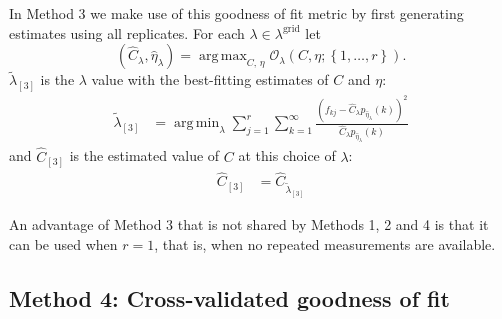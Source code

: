 \documentclass[12pt]{article}
\DeclareMathOperator*{\argmin}{arg\,min}
\DeclareMathOperator*{\argmax}{arg\,max}
\newcommand{\lambdagrid}{\lambda^{\text{grid}}}
\theoremstyle{break}
\theoremstyle{break}
\begin{document}

In Method 3 we make use of this goodness of fit metric by first generating estimates using all replicates.  For each $\lambda \in \lambdagrid$ let
\begin{equation}
\left(\widehat{C}_{\lambda}, \widehat{\eta}_{\lambda} \right) = \argmax_{C, \, \eta} \mathcal{O}_\lambda \left(C, \eta; \left\{1, \dots, r \right\} \right). \label{eq:c_hat_lambdas_method_3}
\end{equation}
$\widetilde{\lambda}_{[3]}$ is the $\lambda$ value with the best-fitting estimates of $C$ and $\eta$:
\begin{align}
\widetilde{\lambda}_{[3]} &= \argmin_{\lambda} \sum_{j=1}^r \sum_{k=1}^{\infty} \frac{ \left( f_{kj} - \widehat{C}_{\lambda} p_{\widehat{\eta}_{\lambda}}(k) \right)^2}{\widehat{C}_{\lambda}p_{\widehat{\eta}_{\lambda}}(k)} \label{eq:selected_lambda_3}
\end{align}
and $\widehat{C}_{[3]}$ is the estimated value of $C$ at this choice of $\lambda$:
\begin{align}
\widehat{C}_{[3]} &= \widehat{C}_{\widetilde{\lambda}_{[3]}}
\end{align}

An advantage of Method 3 that is not shared by Methods 1, 2 and 4 is that it can be used when $r=1$, that is, when no repeated measurements are available.

\subsection{Method 4: Cross-validated goodness of fit}

\end{document}
